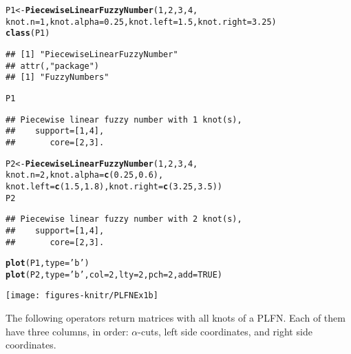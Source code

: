 \documentclass[11pt]{article}\usepackage{graphicx, color}
\makeatletter
\newcommand{\hlfunctioncall}[1]{\textcolor[rgb]{0.501960784313725,0,0.329411764705882}{\textbf{#1}}}%
\newcommand{\hlstring}[1]{\textcolor[rgb]{0.6,0.6,1}{#1}}%
\newenvironment{kframe}{%
 \def\at@end@of@kframe{}%
 \ifinner\ifhmode%
  \def\at@end@of@kframe{\end{minipage}}%
  \begin{minipage}{\columnwidth}%
 \fi\fi%
 \def\FrameCommand##1{\hskip\@totalleftmargin \hskip-\fboxsep
 \colorbox{shadecolor}{##1}\hskip-\fboxsep
     \hskip-\linewidth \hskip-\@totalleftmargin \hskip\columnwidth}%
 \MakeFramed {\advance\hsize-\width
   \@totalleftmargin\z@ \linewidth\hsize
   \@setminipage}}%
 {\par\unskip\endMakeFramed%
 \at@end@of@kframe}
\newenvironment{knitrout}{}{} %
\makeatother
\begin{document}
\begin{knitrout}\small
{}\color{fgcolor}\begin{kframe}
\begin{alltt}
P1 <- \hlfunctioncall{PiecewiseLinearFuzzyNumber}(1, 2, 3, 4,
   knot.n=1, knot.alpha=0.25, knot.left=1.5, knot.right=3.25)
\hlfunctioncall{class}(P1)
\end{alltt}
\begin{verbatim}
## [1] "PiecewiseLinearFuzzyNumber"
## attr(,"package")
## [1] "FuzzyNumbers"
\end{verbatim}
\begin{alltt}
P1
\end{alltt}
\begin{verbatim}
## Piecewise linear fuzzy number with 1 knot(s),
##    support=[1,4],
##       core=[2,3].
\end{verbatim}
\begin{alltt}
P2 <- \hlfunctioncall{PiecewiseLinearFuzzyNumber}(1, 2, 3, 4,
   knot.n=2, knot.alpha=\hlfunctioncall{c}(0.25,0.6),
   knot.left=\hlfunctioncall{c}(1.5,1.8), knot.right=\hlfunctioncall{c}(3.25, 3.5))
P2
\end{alltt}
\begin{verbatim}
## Piecewise linear fuzzy number with 2 knot(s),
##    support=[1,4],
##       core=[2,3].
\end{verbatim}
\begin{alltt}
\hlfunctioncall{plot}(P1, type=\hlstring{'b'})
\hlfunctioncall{plot}(P2, type=\hlstring{'b'}, col=2, lty=2, pch=2, add=TRUE)
\end{alltt}
\end{kframe}
\end{knitrout}


\begin{center}
\begin{knitrout}\small
{}\color{fgcolor}

{\centering \texttt{[image: figures-knitr/PLFNEx1b]} 

}



\end{knitrout}

\end{center}

The following operators return matrices with all knots of a PLFN.
Each of them have three columns, in order: $\alpha$-cuts,
left side coordinates, and right side coordinates.
\end{document}
